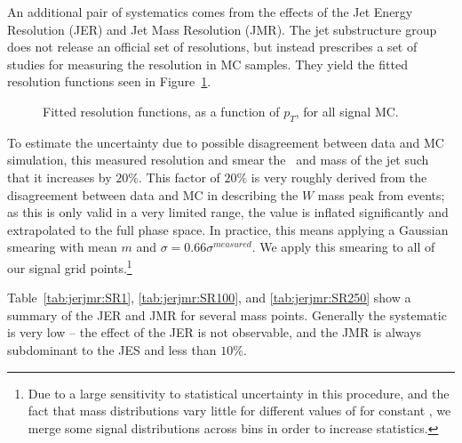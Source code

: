 An additional pair of systematics comes from the effects of the Jet Energy Resolution (JER) and Jet Mass Resolution (JMR). The jet substructure group does not release an official set of resolutions, but instead prescribes a set of studies for measuring the resolution in MC samples. They yield the fitted resolution functions seen in Figure~\ref{fig:res}.
%
\begin{figure}[!ht]
  \centering
  
    
  \caption{Fitted resolution functions, as a function of $p_{T}$, for all signal MC.
           }
           
  \label{fig:res}
\end{figure}
%
To estimate the uncertainty due to possible disagreement between data and MC simulation, this measured resolution and smear the \pT\ and mass of the jet such that it increases by $20\%$. This factor of $20\%$ is very roughly derived from the disagreement between data and MC in describing the $W$ mass peak from \ttbar events; as this is only valid in a very limited \pt range, the value is inflated significantly and extrapolated to the full phase space. In practice, this means applying a Gaussian smearing with mean $m$ and $\sigma = 0.66\sigma^{measured}$. We apply this smearing to all of our signal grid points.\footnote{Due to a large sensitivity to statistical uncertainty in this procedure, and the fact that mass distributions vary little for different values of \mninoone for constant \mgluino, we merge some signal distributions across \mninoone bins in order to increase statistics.} %
%


Table~\ref{tab:jerjmr:SR1}, \ref{tab:jerjmr:SR100}, and \ref{tab:jerjmr:SR250} show a summary of the JER and JMR for several mass points. Generally the systematic is very low -- the effect of the JER is not observable, and the JMR is always subdominant to the JES and less than $10\%$.

  
